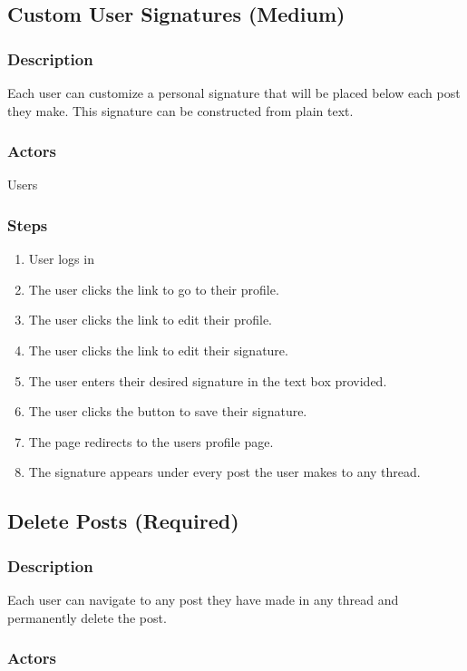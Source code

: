 \documentclass[12pt]{scrartcl}
\begin{document}
\subsection{Custom User Signatures (Medium)}
\subsubsection{Description}

Each user can customize a personal signature that will be placed below each post they make. This signature can be constructed from plain text.

\subsubsection{Actors}

Users

\subsubsection{Steps}

\begin{enumerate}
\item User logs in
\item The user clicks the link to go to their profile.
\item The user clicks the link to edit their profile.
\item The user clicks the link to edit their signature.
\item The user enters their desired signature in the text box provided.
\item The user clicks the button to save their signature.
\item The page redirects to the users profile page.
\item The signature appears under every post the user makes to any thread.
\end{enumerate}

\subsection{Delete Posts (Required)}
\subsubsection{Description}

Each user can navigate to any post they have made in any thread and permanently delete the post.

\subsubsection{Actors}
\end{document}
